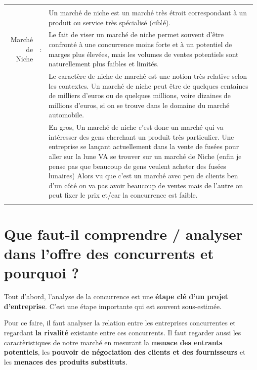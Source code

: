 \documentclass{article}
\begin{document}
\begin{tabular}{|rcl|}
&&\\
\hline
&&\\
				 &   & \multicolumn{1}{p{.8\textwidth}|}{Un marché de niche est un marché très étroit correspondant à un produit ou service très spécialisé (ciblé).}\\
Marché de Niche & : & \multicolumn{1}{p{.8\textwidth}|}{Le fait de viser un marché de niche permet souvent d’être confronté à une concurrence moins forte et à un potentiel de marges plus élevées, mais les volumes de ventes potentiels sont naturellement plus faibles et limités.}\\
				 &  & \multicolumn{1}{p{.8\textwidth}|}{Le caractère de niche de marché est une notion très relative selon les contextes. Un marché de niche peut être de quelques centaines de milliers d’euros ou de quelques millions, voire dizaines de millions d’euros, si on se trouve dans le domaine du marché automobile.}\\
				 &  & \multicolumn{1}{p{.8\textwidth}|}{En gros, Un marché de niche c'est donc un marché qui va intéresser des gens cherchant un produit très particulier. Une entreprise se lançant actuellement dans la vente de fusées pour aller sur la lune VA se trouver sur un marché de Niche (enfin je pense pas que beaucoup de gens veulent acheter des fusées lunaires) Alors vu que c'est un marché avec peu de clients ben d'un côté on va pas avoir beaucoup de ventes mais de l'autre on peut fixer le prix et/car la concurrence est faible.}\\
&&\\
\hline
\end{tabular}
\section{Que faut-il comprendre / analyser dans l’offre des concurrents et pourquoi ?}
Tout d'abord, l'analyse de la concurrence est une \textbf{étape clé d'un projet d'entreprise}. C'est une étape importante qui est souvent sous-estimée.

Pour ce faire, il faut analyser la relation entre les entreprises concurrentes et regardant \textbf{la rivalité} existante entre ces concurrents. Il faut regarder aussi les caractèristiques de notre marché en mesurant la \textbf{menace des entrants potentiels}, les \textbf{pouvoir de négociation des clients et des fournisseurs} et les \textbf{menaces des produits substituts}.
\end{document}
